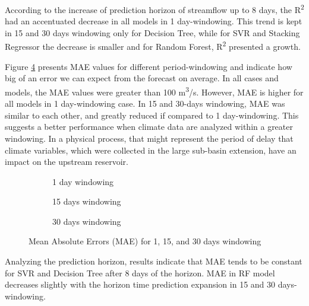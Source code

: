 \documentclass[12pt]{article}
\begin{document}
According to the increase of prediction horizon of streamflow up to 8 days, the R\textsuperscript{2} had an accentuated decrease in all models in 1 day-windowing. This trend is kept in 15 and 30 days windowing only for Decision Tree, while for SVR and Stacking Regressor the decrease is smaller and for Random Forest, R\textsuperscript{2} presented a growth.

Figure \ref{fig:sfigMAE} presents MAE values for different period-windowing and indicate how big of an error we can expect from the forecast on average. In all cases and models, the MAE values were greater than 100 m\textsuperscript{3}/s. However, MAE is higher for all models in 1 day-windowing case. In 15 and 30-days windowing, MAE was similar to each other, and greatly reduced if compared to 1 day-windowing. This suggests a better performance when climate data are analyzed within a greater windowing. In a physical process, that might represent the period of delay that climate variables, which were collected in the large sub-basin extension, have an impact on the upstream reservoir.

\begin{figure}[htbp]
    \centering
    \begin{subfigure}[b]{.49\textwidth}
        \centering
        
        \caption{1 day windowing}
        \label{fig:sfig1MAE}
    \end{subfigure}
    \begin{subfigure}[b]{.49\textwidth}
        \centering
        
        \caption{15 days windowing}
        \label{fig:sfig2MAE}
    \end{subfigure}
    \begin{subfigure}[b]{\textwidth}
        \centering
        
        \captionsetup{justification=justified,singlelinecheck=false}
        \caption{30 days windowing}
        \label{fig:sfig3MAE}
    \end{subfigure}
    \caption{Mean Absolute Errors (MAE) for  1,  15, and  30 days windowing}
    \label{fig:sfigMAE}
\end{figure}

Analyzing the prediction horizon, results indicate that MAE tends to be constant for SVR and Decision Tree after 8 days of the horizon. MAE in RF model decreases slightly with the horizon time prediction expansion in 15 and 30 days-windowing.
\end{document}
